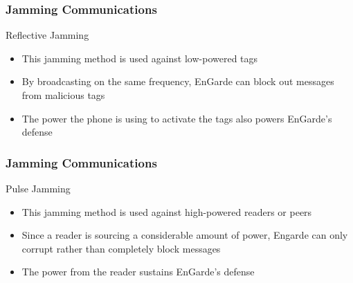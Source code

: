 \documentclass[unknownkeysallowed]{beamer}
\begin{document}




\begin{frame}
\frametitle{Jamming Communications}
  \begin{center}
  \begin{minipage}{.9\textwidth}
  \begin{block}{Reflective Jamming}
    \begin{itemize}
      \item{This jamming method is used against low-powered tags}
      \pause
      \vspace{1mm}
      \item{By broadcasting on the same frequency, EnGarde can block out messages from malicious tags}
      \pause
      \vspace{1mm}
      \item{The power the phone is using to activate the tags also powers EnGarde's defense}
    \end{itemize}
  \end{block}
  \end{minipage}
  \end{center}
\end{frame}

\begin{frame}
\frametitle{Jamming Communications}
  \begin{center}
  \begin{minipage}{.9\textwidth}
  \begin{block}{Pulse Jamming}
    \begin{itemize}
      \item{This jamming method is used against high-powered readers or peers}
      \pause
      \vspace{1mm}
      \item{Since a reader is sourcing a considerable amount of power, Engarde can only corrupt rather than completely block messages}
      \pause
      \vspace{1mm}
      \item{The power from the reader sustains EnGarde's defense}
    \end{itemize}
  \end{block}
  \end{minipage}
  \end{center}
\end{frame}
\end{document}
